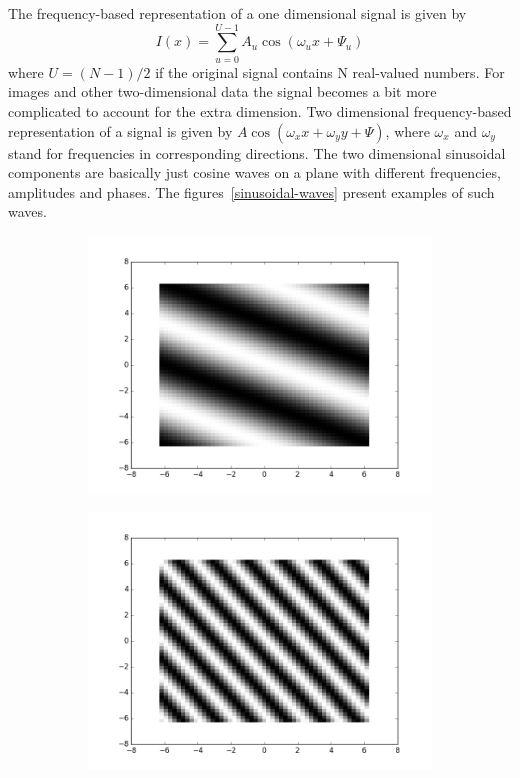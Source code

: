 \documentclass[]{article}
\begin{document}
The frequency-based representation of a one dimensional signal is given by
\begin{equation}
  I(x) = \sum_{u=0}^{U-1}{A_{u}\cos(\omega_{u}x+\Psi_{u})}
\end{equation}
where $U = (N-1)/2$ if the original signal contains N real-valued numbers. For
images and other two-dimensional data the signal becomes a bit more complicated
to account for the extra dimension. Two dimensional frequency-based
representation of a signal is given by $A \cos(\omega_{x} x + \omega_{y} y +
\Psi)$, where $\omega_{x}$ and $\omega_{y}$ stand for frequencies in
corresponding directions. The two dimensional sinusoidal components are
basically just cosine waves on a plane with different frequencies, amplitudes
and phases. The figures~\ref{sinusoidal-waves} present examples of such waves.
\begin{figure}
  \label{fig:sinusoidal-waves}
  \centering
    \begin{subfigure}[t]{0.49\textwidth}
      \centering
      \includegraphics[width=0.99\linewidth]{sinusoidal1.png}
    \end{subfigure}
    \begin{subfigure}[t]{0.49\textwidth}
      \centering
      \includegraphics[width=0.99\linewidth]{sinusoidal2.png}

\end{subfigure}
\end{figure}
\end{document}
